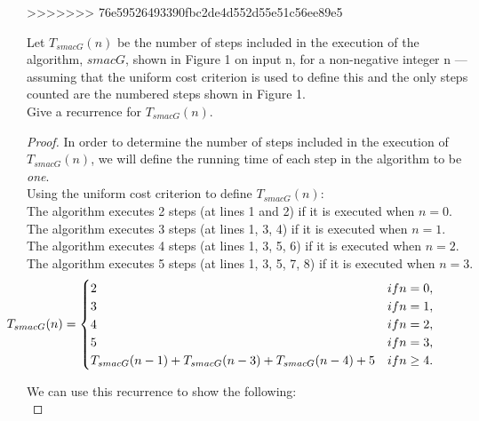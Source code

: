 \documentclass[12pt]{article}
\newenvironment{problem}[2][Problem]{\begin{trivlist}
\item[\hskip \labelsep {\bfseries #1}\hskip \labelsep {\bfseries #2.}]}{\end{trivlist}}
\begin{document}
>>>>>>> 76e59526493390fbc2de4d552d55e51c56ee89e5




\begin{problem}{4}
Let $T_{smacG}(n)$ be the number of steps included in the execution of the algorithm, $smacG$,
shown in Figure 1 on input n, for a non-negative integer n — assuming that the uniform
cost criterion is used to define this and the only steps counted are the numbered steps
shown in Figure 1.
\\
Give a recurrence for $T_{smacG}(n)$.
\end{problem}

\begin{proof}
    In order to determine the number of steps included in the execution of $T_{smacG}(n)$, we will define the running time of each step in the algorithm to be \textit{one}.\\

    \noindent Using the uniform cost criterion to define $T_{smacG}(n)$: \\
    
    \noindent The algorithm executes 2 steps (at lines 1 and 2) if it is executed when $n = 0$. \\
    \noindent The algorithm executes 3 steps (at lines 1, 3, 4) if it is executed when $n = 1$. \\
    \noindent The algorithm executes 4 steps (at lines 1, 3, 5, 6) if it is executed when $n = 2$. \\
    \noindent The algorithm executes 5 steps (at lines 1, 3, 5, 7, 8) if it is executed when $n = 3$. \\
    
    
    \[ \hspace*{-17mm}T_{smacG}(n) = 
        \begin{cases} 
          2 & if n = 0, \\
          3 & if n = 1, \\
          4 & if n = 2, \\
          5 & if n = 3, \\
          T_{smacG}(n-1) + T_{smacG}(n-3) + T_{smacG}(n-4) + 5 & if n \geq 4.
       \end{cases}
    \]
    
    \noindent We can use this recurrence to show the following:\\
    

\end{proof}
\end{document}
